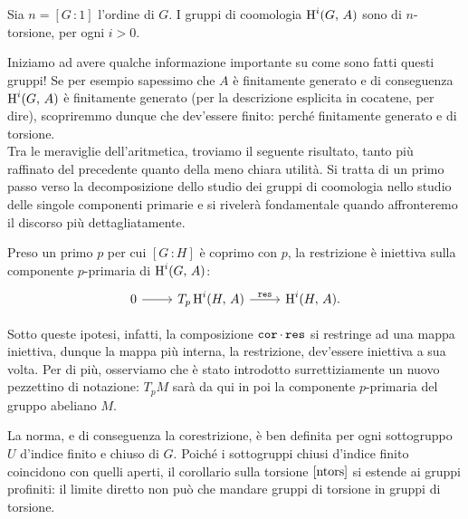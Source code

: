 \begin{corollary}\label{ntors}
	Sia $ n = [G 	\,\colon 1] $ l'ordine di $ G $. I gruppi di coomologia $ \operatorname{H}^i(G, \, A) $ sono di $ n $-torsione, per ogni $ i > 0 $.
\end{corollary}

Iniziamo ad avere qualche informazione importante su come sono fatti questi gruppi! Se per esempio sapessimo che $ A $ è finitamente generato e di conseguenza $ \operatorname{H}^i(G, \, A) $ è finitamente generato (per la descrizione esplicita in cocatene, per dire), scopriremmo dunque che dev'essere finito: perché finitamente generato e di torsione. \\

Tra le meraviglie dell'aritmetica, troviamo il seguente risultato, tanto più raffinato del precedente quanto della meno chiara utilità. Si tratta di un primo passo verso la decomposizione dello studio dei gruppi di coomologia nello studio delle singole componenti primarie e si rivelerà fondamentale quando affronteremo il discorso più dettagliatamente.

\begin{lemma}\label{injp}
	Preso un primo $ p $ per cui $ [G \, \colon H] $ è coprimo con $ p $, la restrizione è iniettiva sulla componente $ p $-primaria di $ \operatorname{H}^i(G, \, A) $:
	\[ \begin{tikzcd}
	0 \rar & T_p \HH^i(H, \, A) \rar["\Res"] & \HH^i(H, \, A).
	\end{tikzcd}\]
\end{lemma}

Sotto queste ipotesi, infatti, la composizione $ \operatorname{\mathtt{cor}} \cdot \operatorname{\mathtt{res}} $ si restringe ad una mappa iniettiva, dunque la mappa più interna, la restrizione, dev'essere iniettiva a sua volta. Per di più, osserviamo che è stato introdotto surrettiziamente un nuovo pezzettino di notazione: $ T_p M $ sarà da qui in poi la componente $ p $-primaria del gruppo abeliano $ M $. \\

\begin{profinite}
	La norma, e di conseguenza la corestrizione, è ben definita per ogni sottogruppo $ U $ d'indice finito e chiuso di $ G $.
	Poiché i sottogruppi chiusi d'indice finito coincidono con quelli aperti, il corollario sulla torsione $ \ref{ntors} $ si estende ai gruppi profiniti: il limite diretto non può che mandare gruppi di torsione in gruppi di torsione.
\end{profinite}

